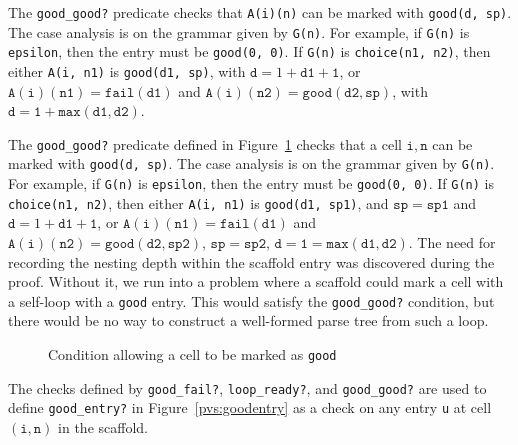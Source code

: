 \documentclass[letterpaper,conference,compsoc]{IEEEtran}
\begin{document}
% 			

                      The \texttt{good\_good?} predicate checks that \texttt{A(i)(n)} can be marked
                      with \texttt{good(d, sp)}\@.  The case analysis is on the grammar given by \texttt{G(n)}\@.  For example, if \texttt{G(n)} is \texttt{epsilon}, then the entry must be \texttt{good(0, 0)}\@.  If \texttt{G(n)} is \texttt{choice(n1, n2)}, then either \texttt{A(i, n1)} is \texttt{good(d1, sp)}, with $\mathtt{d} = 1 + \mathtt{d1 + 1}$, or
$\mathtt{A(i)(n1)} = \mathtt{fail(d1)}$ and $\mathtt{A(i)(n2)} = \mathtt{good(d2, sp)}$, with $\mathtt{d} = \mathtt{1 + max(d1, d2)}$\@.  
                      



The \texttt{good\_good?} predicate defined in
Figure~\ref{pvs:goodgood} checks that a cell $\mathtt{i, n}$ can be
marked with \texttt{good(d, sp)}\@.  The case analysis is on the
grammar given by \texttt{G(n)}\@.  For example, if \texttt{G(n)} is
\texttt{epsilon}, then the entry must be \texttt{good(0, 0)}\@.  If
\texttt{G(n)} is \texttt{choice(n1, n2)}, then either \texttt{A(i,
  n1)} is \texttt{good(d1, sp1)}, and $\mathtt{sp} = \mathtt{sp1}$ and
$\mathtt{d} = 1 + \mathtt{d1 + 1}$, or
$\mathtt{A(i)(n1)} = \mathtt{fail(d1)}$ and
$\mathtt{A(i)(n2)} = \mathtt{good(d2, sp2)}$,
$\mathtt{sp} = \mathtt{sp2}$,
$\mathtt{d} = \mathtt{1 = max(d1, d2)}$\@.
The need for recording the nesting depth within the scaffold entry was
discovered during the proof.  Without it, we run into a problem where
a scaffold could mark a cell with a self-loop with a \texttt{good} entry. 
This would satisfy the \texttt{good\_good?} condition, but there would be no
way to construct a well-formed parse tree from such a loop.  

\begin{figure}[h!]
  
    \vspace*{-4mm}
			\caption{Condition allowing a cell to be marked as \texttt{good}}
			\label{pvs:goodgood}
\end{figure}

The checks defined by \texttt{good\_fail?}, \texttt{loop\_ready?}, and \texttt{good\_good?} are used to define \texttt{good\_entry?} in Figure~\ref{pvs:goodentry}
as a check on any entry \texttt{u}
at cell $(\mathtt{i, n})$ in the scaffold.  
\end{document}
